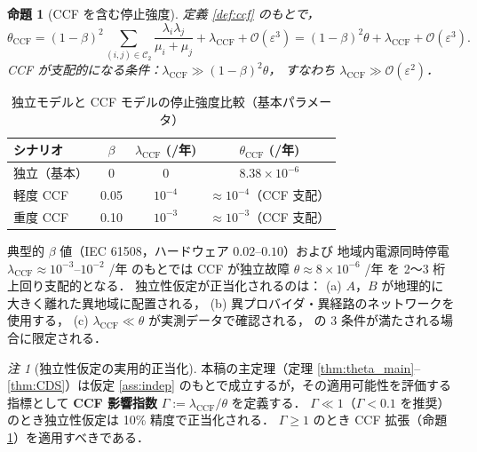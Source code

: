 \documentclass[12pt,a4paper]{article}
\theoremstyle{plain}
\newtheorem{proposition}[theorem]{命題}
\theoremstyle{definition}
\theoremstyle{remark}
\newtheorem{remark}[theorem]{注}
\newcommand{\calO}{\mathcal{O}}
\newcommand{\eps}{\varepsilon}
\newcommand{\calCtwo}{\mathcal{C}_2}
\begin{document}
\begin{proposition}[CCF を含む停止強度]\label{prop:ccf}
  定義 \ref{def:ccf} のもとで，
  \begin{equation}\label{eq:theta_CCF}
    \theta_{\mathrm{CCF}}
    = (1-\beta)^2\sum_{(i,j)\in\calCtwo}\frac{\lambda_i\lambda_j}{\mu_i+\mu_j}
    + \lambda_{\mathrm{CCF}}
    + \calO(\eps^3)
    = (1-\beta)^2\theta + \lambda_{\mathrm{CCF}} + \calO(\eps^3).
  \end{equation}
  CCF が支配的になる条件：$\lambda_{\mathrm{CCF}} \gg (1-\beta)^2\theta$，
  すなわち $\lambda_{\mathrm{CCF}} \gg \calO(\eps^2)$．
\end{proposition}

\begin{table}[H]
  \centering
  \caption{独立モデルと CCF モデルの停止強度比較（基本パラメータ）}
  \label{tab:CCF}
  \begin{tabular}{lccc}
    \toprule
    シナリオ & $\beta$ & $\lambda_{\mathrm{CCF}}$ (/年) & $\theta_{\mathrm{CCF}}$ (/年) \\
    \midrule
    独立（基本） & 0 & 0 & $8.38\times10^{-6}$ \\
    軽度 CCF & 0.05 & $10^{-4}$ & $\approx 10^{-4}$（CCF 支配） \\
    重度 CCF & 0.10 & $10^{-3}$ & $\approx 10^{-3}$（CCF 支配） \\
    \bottomrule
  \end{tabular}
  \vspace{2pt}
  {\small
    典型的 $\beta$ 値（IEC 61508，ハードウェア $0.02$--$0.10$）および
    地域内電源同時停電 $\lambda_{\mathrm{CCF}}\approx10^{-3}$--$10^{-2}$ /年 のもとでは
    CCF が独立故障 $\theta\approx8\times10^{-6}$ /年 を 2〜3 桁上回り支配的となる．
    独立性仮定が正当化されるのは：
    (a) $A$，$B$ が地理的に大きく離れた異地域に配置される，
    (b) 異プロバイダ・異経路のネットワークを使用する，
    (c) $\lambda_{\mathrm{CCF}}\ll\theta$ が実測データで確認される，
    の 3 条件が満たされる場合に限定される．}
\end{table}

\begin{remark}[独立性仮定の実用的正当化]
  本稿の主定理（定理 \ref{thm:theta_main}--\ref{thm:CDS}）は仮定 \ref{ass:indep}
  のもとで成立するが，その適用可能性を評価する指標として
  \textbf{CCF 影響指数} $\Gamma := \lambda_{\mathrm{CCF}}/\theta$ を定義する．
  $\Gamma \ll 1$（$\Gamma < 0.1$ を推奨）のとき独立性仮定は
  10\% 精度で正当化される．
  $\Gamma \ge 1$ のとき CCF 拡張（命題 \ref{prop:ccf}）を適用すべきである．
\end{remark}
\end{document}
